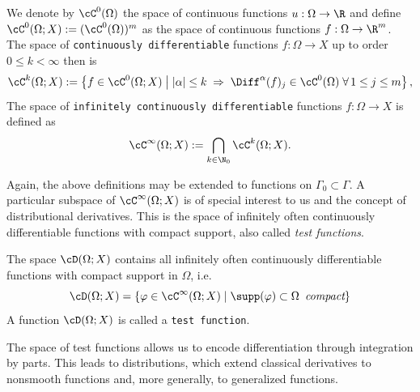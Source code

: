 \begin{definition}
	We denote by $\cC^0(\Omega)$ the space of continuous functions $u:\Omega\to\R$ and define $\cC^0(\Omega;X):= (\cC^0(\Omega))^m$ as the space of continuous functions $f:\Omega\to\R^m$. The space of {\tt continuously differentiable} functions $f:\Omega\to X$ up to order $0\le k<\infty$ then is
	\begin{equation*}
		\cC^k(\Omega;X):=\left\{ f\in\cC^0(\Omega;X)\;\middle|\; |\alpha|\le k\;\Rightarrow\;\Diff^\alpha (f)_j\in\cC^0(\Omega)\;\forall\,1\le j\le m\right\},
	\end{equation*}
	The space of {\tt infinitely continuously differentiable} functions $f:\Omega\to X$ is defined as
	\begin{equation*}
		\cC^\infty(\Omega;X):= \bigcap_{k\in \N_0}\cC^k(\Omega;X).
	\end{equation*}
\end{definition}

Again, the above definitions may be extended to functions on $\Gamma_0\subset\Gamma$. A particular subspace of $\cC^\infty(\Omega;X)$ is of special interest to us and the concept of distributional derivatives. This is the space of infinitely often continuously differentiable functions with compact support, also called {\em test functions}.

\begin{definition}
	The space $\cD(\Omega;X)$ contains all infinitely often continuously differentiable functions with compact support in $\Omega$, i.e.\
	\begin{equation*}
		\cD(\Omega;X) = \left\{\varphi\in\cC^\infty(\Omega;X)\;\middle|\;\supp(\varphi)\subset\Omega\text{\em\enspace compact}\right\}
	\end{equation*}
	A function $\cD(\Omega;X)$ is called a {\tt test function}.
\end{definition}

The space of test functions allows us to encode differentiation through integration by parts. This leads to distributions, which extend classical derivatives to nonsmooth functions and, more generally, to generalized functions.

